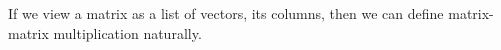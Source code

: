 

If we view a matrix as a list of vectors, its columns, then we can define matrix-matrix multiplication naturally.

\blankpage
